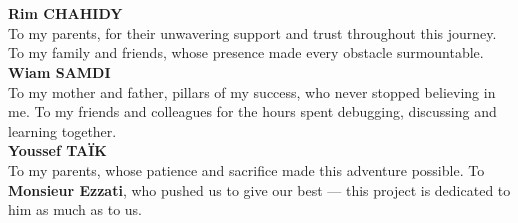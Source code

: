 \chapter*{}
\thispagestyle{empty}
\vspace*{3cm}

\begin{flushright}
\itshape\large

\textcolor{NavyBlue}{\normalsize\bfseries\upshape Rim CHAHIDY}\\[10pt]
To my parents, for their unwavering support and trust throughout this journey.
To my family and friends, whose presence made every obstacle surmountable.\\[2.5cm]

\textcolor{NavyBlue}{\normalsize\bfseries\upshape Wiam SAMDI}\\[10pt]
To my mother and father, pillars of my success, who never stopped believing
in me. To my friends and colleagues for the hours spent debugging, discussing
and learning together.\\[2.5cm]

\textcolor{NavyBlue}{\normalsize\bfseries\upshape Youssef TAÏK}\\[10pt]
To my parents, whose patience and sacrifice made this adventure possible.
To \textbf{Monsieur Ezzati}, who pushed us to give our best — this project
is dedicated to him as much as to us.

\end{flushright}

